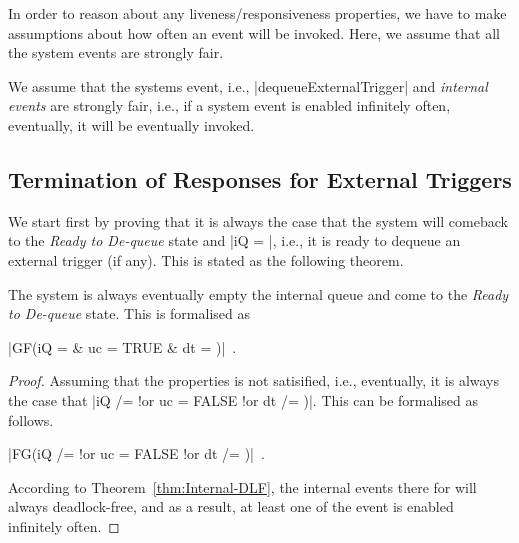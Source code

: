 In order to reason about any liveness/responsiveness properties, we
have to make assumptions about how often an event will be invoked.
Here, we assume that all the system events are strongly fair.
\begin{assumption}
  \label{asm:SF}
  We assume that the systems event, i.e., |dequeueExternalTrigger|
  and \emph{internal events} are strongly fair, i.e., if a system
  event is enabled infinitely often, eventually, it will be eventually
  invoked.
\end{assumption}


\subsection{Termination of Responses for External Triggers}
\label{sec:contr-rema-resp}

We start first by proving that it is always the case that the system
will comeback to the \emph{Ready to De-queue} state and |iQ = {}|,
i.e., it is ready to dequeue an external trigger (if any).  This is
stated as the following theorem.
\begin{theorem}
  The system is always eventually empty the internal queue and come to
  the \emph{Ready to De-queue} state.  This is formalised as
  \begin{center}
    |GF(iQ = {} & uc = TRUE & dt = {})|~.
  \end{center}
\end{theorem}
\begin{proof}
  Assuming that the properties is not satisified, i.e., eventually,
  it is always the case that |iQ /= {} !or  uc = FALSE !or dt /=
  {})|. This can be formalised as follows.
  \begin{center}
    |FG(iQ /= {} !or uc = FALSE !or dt /= {})|~.    
  \end{center}
  According to Theorem~\ref{thm:Internal-DLF}, the internal events
  there for will always deadlock-free, and as a result, at least one
  of the event is enabled infinitely often.
\end{proof}


